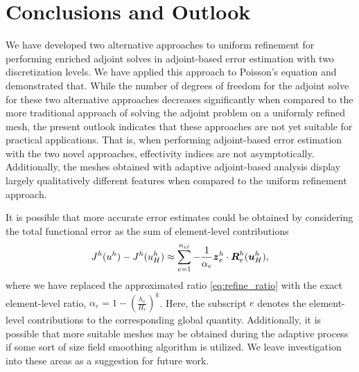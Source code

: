 \section{Conclusions and Outlook}

We have developed two alternative approaches to uniform refinement
for performing enriched adjoint solves in adjoint-based error estimation
with two discretization levels. We have applied this approach to
Poisson's equation and demonstrated that. While the number of
degrees of freedom for the adjoint solve for these two
alternative approaches decreases significantly when compared to the
more traditional approach of solving the adjoint problem on
a uniformly refined mesh, the present outlook indicates that
these approaches are not yet suitable for practical applications.
That is, when performing adjoint-based error estimation with the
two novel approaches, effectivity indices are not asymptotically.
Additionally, the meshes obtained with adaptive adjoint-based
analysis display largely qualitatively different features when
compared to the uniform refinement approach.

It is possible that more accurate error estimates could be
obtained by considering the total functional error as the sum
of element-level contributions
\begin{gather}
J^h(u^h) - J^h(u^h_H) \approx \sum_{e=1}^{n_{el}}
- \frac{1}{\alpha_e} \boldsymbol{z}^h_e \cdot \boldsymbol{R}^h_e(\boldsymbol{u}^h_H),
\end{gather}
where we have replaced the approximated ratio
\eqref{eq:refine_ratio} with the exact element-level
ratio, $\alpha_e = 1 - \left( \frac{h_e}{H_e} \right)^k$. Here, the
subscript $e$ denotes the element-level contributions
to the corresponding global quantity. Additionally, it is
possible that more suitable meshes may be obtained during
the adaptive process if some sort of size field smoothing
algorithm is utilized. We leave investigation into these
areas as a suggestion for future work.


